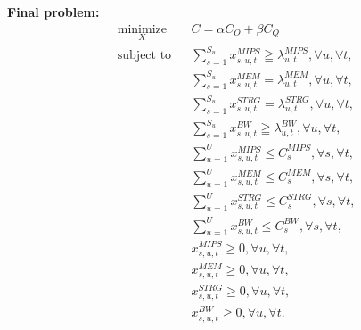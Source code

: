 \documentclass{article}
\begin{document}
\noindent\textbf{Final problem:}\\[6pt]
\begin{equation*}
\begin{aligned}
& \underset{X}{\text{minimize}}
& & C = \alpha C_O + \beta C_Q \\
& \text{subject to}
& & \sum_{s=1}^{S_u} x^{MIPS}_{s,u,t} \geqq \lambda^{MIPS}_{u,t}, \forall u, \forall t, \\
&&& \sum_{s=1}^{S_u} x^{MEM}_{s,u,t} = \lambda^{MEM}_{u,t}, \forall u, \forall t, \\
&&& \sum_{s=1}^{S_u} x^{STRG}_{s,u,t} = \lambda^{STRG}_{u,t}, \forall u, \forall t, \\
&&& \sum_{s=1}^{S_u}x^{BW}_{s,u,t} \geqq \lambda^{BW}_{u,t}, \forall u, \forall t, \\
&&& \sum_{u=1}^U x^{MIPS}_{s,u,t} \leq C^{MIPS}_{s}, \forall s, \forall t, \\
&&& \sum_{u=1}^U x^{MEM}_{s,u,t} \leq C^{MEM}_{s}, \forall s, \forall t, \\
&&& \sum_{u=1}^U x^{STRG}_{s,u,t} \leq C^{STRG}_{s}, \forall s, \forall t, \\
&&& \sum_{u=1}^U x^{BW}_{s,u,t} \leq C^{BW}_{s}, \forall s, \forall t, \\[6pt]
&&& x^{MIPS}_{s,u,t} \geq 0, \forall u, \forall t, \\[6pt]
&&& x^{MEM}_{s,u,t} \geq 0, \forall u, \forall t, \\[6pt]
&&& x^{STRG}_{s,u,t} \geq 0, \forall u, \forall t, \\[6pt]
&&& x^{BW}_{s,u,t} \geq 0, \forall u, \forall t.
\end{aligned}
\end{equation*}
\end{document}
